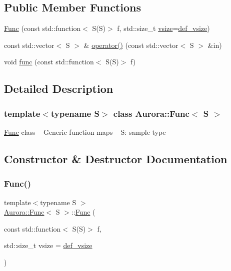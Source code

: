\subsection*{Public Member Functions}
\begin{DoxyCompactItemize}
\item 
\hyperlink{class_aurora_1_1_func_aca7dd7976ed6205103f2775b61706c0f}{Func} (const std\+::function$<$ S(S)$>$ f, std\+::size\+\_\+t \hyperlink{class_aurora_1_1_snd_base_af9e21aaf411b17f7a8221c991ce5d291}{vsize}=\hyperlink{namespace_aurora_afaaddf667a06e7ce23c667a8b7295263}{def\+\_\+vsize})
\item 
const std\+::vector$<$ S $>$ \& \hyperlink{class_aurora_1_1_func_a60e9dad421d80a9f9eb99cfbac104729}{operator()} (const std\+::vector$<$ S $>$ \&in)
\item 
void \hyperlink{class_aurora_1_1_func_ad0b316fc635de73ddcd75f97293c10d9}{func} (const std\+::function$<$ S(S)$>$ f)
\end{DoxyCompactItemize}


\subsection{Detailed Description}
\subsubsection*{template$<$typename S$>$\newline
class Aurora\+::\+Func$<$ S $>$}

\hyperlink{class_aurora_1_1_func}{Func} class ~\newline
Generic function maps ~\newline
S\+: sample type 

\subsection{Constructor \& Destructor Documentation}
\mbox{\label{class_aurora_1_1_func_aca7dd7976ed6205103f2775b61706c0f}} 
\subsubsection{\texorpdfstring{Func()}{Func()}}
{\footnotesize\ttfamily template$<$typename S $>$ \\
\hyperlink{class_aurora_1_1_func}{Aurora\+::\+Func}$<$ S $>$\+::\hyperlink{class_aurora_1_1_func}{Func} (\begin{DoxyParamCaption}\item[{const std\+::function$<$ S(S)$>$}]{f,  }\item[{std\+::size\+\_\+t}]{vsize = {\ttfamily \hyperlink{namespace_aurora_afaaddf667a06e7ce23c667a8b7295263}{def\+\_\+vsize}} }\end{DoxyParamCaption})\hspace{0.3cm}{\ttfamily [inline]}}


